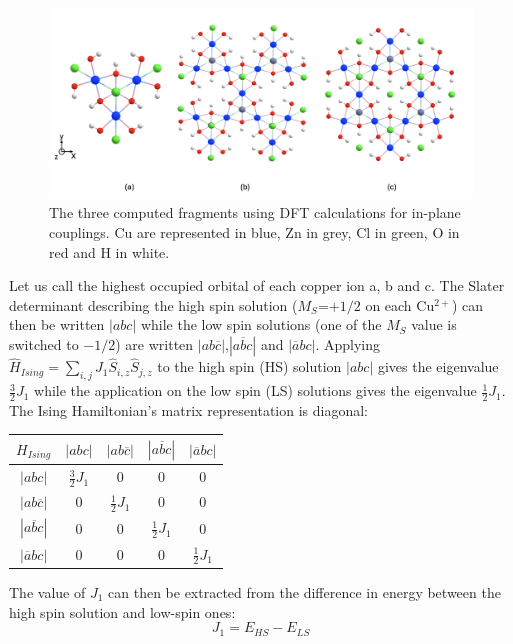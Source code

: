 \documentclass[12pt]{report}
\numberwithin{equation}{section}
\begin{document}
\begin{figure}[!ht]
    \centering
    \includegraphics[width=\textwidth]{Images/Groupir.png}
    \caption{The three computed fragments using DFT calculations for in-plane couplings. Cu are represented in blue, Zn in grey, Cl in green, O in red and H in white.}
    \label{FragmentDFT}
\end{figure}

Let us call the highest occupied orbital of each copper ion a, b and c. 
The Slater determinant describing the high spin solution ($M_S$=$+1/2$ on each Cu$^{2+}$) can then be written $|abc|$ while the low spin solutions (one of the $M_S$ value is switched to $-1/2$) are written $|ab\overline{c}|$,$|a\overline{b}c|$ and $|\overline{a}bc|$.
Applying $\hat{H}_{Ising}=\sum_{i,j}J_1 \hat{S}_{i,z}\hat{S}_{j,z}$ to the high spin (HS) solution $|abc|$ gives the eigenvalue $\frac{3}{2}J_1$ while the application on the low spin (LS) solutions gives the eigenvalue $\frac{1}{2}J_1$. 
The Ising Hamiltonian's matrix representation is diagonal:

\begin{center}
    \begin{tabular}{c | c c c c}
        $H_{Ising}$ & $|abc|$ & $|ab\overline{c}|$&$|a\overline{b}c|$ & $|\overline{a}bc|$\\
        \hline
        $|abc|$ & $\frac{3}{2}J_1$ & 0 & 0 & 0\\
        $|ab\overline{c}|$ & 0 & $\frac{1}{2}J_1 $& 0 & 0\\
        $|a\overline{b}c|$ & 0 & 0 & $\frac{1}{2}J_1 $ & 0 \\
        $|\overline{a}bc|$ & 0 & 0 & 0 & $\frac{1}{2}J_1 $
    \end{tabular}
\end{center}

The value of $J_1$ can then be extracted from the difference in energy between the high spin solution and low-spin ones:
\begin{equation}
    J_1=E_{HS}-E_{LS}
\end{equation}
\end{document}
